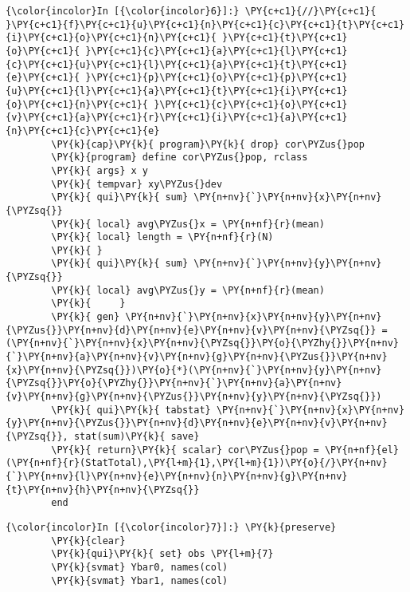 \documentclass[11pt,notitlepage]{article}\usepackage[]{graphicx}\usepackage[]{color}
\makeatletter
\newenvironment{kframe}{%
 \def\at@end@of@kframe{}%
 \ifinner\ifhmode%
  \def\at@end@of@kframe{\end{minipage}}%
  \begin{minipage}{\columnwidth}%
 \fi\fi%
 \def\FrameCommand##1{\hskip\@totalleftmargin \hskip-\fboxsep
 \colorbox{shadecolor}{##1}\hskip-\fboxsep
     \hskip-\linewidth \hskip-\@totalleftmargin \hskip\columnwidth}%
 \MakeFramed {\advance\hsize-\width
   \@totalleftmargin\z@ \linewidth\hsize
   \@setminipage}}%
 {\par\unskip\endMakeFramed%
 \at@end@of@kframe}
\newenvironment{knitrout}{}{} %
\makeatother
\begin{document}
\begin{enumerate}[a)]
\begin{knitrout}
\begin{kframe}
    \begin{Verbatim}[commandchars=\\\{\}]
{\color{incolor}In [{\color{incolor}6}]:} \PY{c+c1}{//}\PY{c+c1}{ }\PY{c+c1}{f}\PY{c+c1}{u}\PY{c+c1}{n}\PY{c+c1}{c}\PY{c+c1}{t}\PY{c+c1}{i}\PY{c+c1}{o}\PY{c+c1}{n}\PY{c+c1}{ }\PY{c+c1}{t}\PY{c+c1}{o}\PY{c+c1}{ }\PY{c+c1}{c}\PY{c+c1}{a}\PY{c+c1}{l}\PY{c+c1}{c}\PY{c+c1}{u}\PY{c+c1}{l}\PY{c+c1}{a}\PY{c+c1}{t}\PY{c+c1}{e}\PY{c+c1}{ }\PY{c+c1}{p}\PY{c+c1}{o}\PY{c+c1}{p}\PY{c+c1}{u}\PY{c+c1}{l}\PY{c+c1}{a}\PY{c+c1}{t}\PY{c+c1}{i}\PY{c+c1}{o}\PY{c+c1}{n}\PY{c+c1}{ }\PY{c+c1}{c}\PY{c+c1}{o}\PY{c+c1}{v}\PY{c+c1}{a}\PY{c+c1}{r}\PY{c+c1}{i}\PY{c+c1}{a}\PY{c+c1}{n}\PY{c+c1}{c}\PY{c+c1}{e}
        \PY{k}{cap}\PY{k}{ program}\PY{k}{ drop} cor\PYZus{}pop
        \PY{k}{program} define cor\PYZus{}pop, rclass
        \PY{k}{	args} x y	
        \PY{k}{	tempvar} xy\PYZus{}dev 
        \PY{k}{	qui}\PY{k}{ sum} \PY{n+nv}{`}\PY{n+nv}{x}\PY{n+nv}{\PYZsq{}}
        \PY{k}{	local} avg\PYZus{}x = \PY{n+nf}{r}(mean)
        \PY{k}{	local} length = \PY{n+nf}{r}(N)	
        \PY{k}{	}
        \PY{k}{	qui}\PY{k}{ sum} \PY{n+nv}{`}\PY{n+nv}{y}\PY{n+nv}{\PYZsq{}}
        \PY{k}{	local} avg\PYZus{}y = \PY{n+nf}{r}(mean)
        \PY{k}{		}
        \PY{k}{	gen} \PY{n+nv}{`}\PY{n+nv}{x}\PY{n+nv}{y}\PY{n+nv}{\PYZus{}}\PY{n+nv}{d}\PY{n+nv}{e}\PY{n+nv}{v}\PY{n+nv}{\PYZsq{}} = (\PY{n+nv}{`}\PY{n+nv}{x}\PY{n+nv}{\PYZsq{}}\PY{o}{\PYZhy{}}\PY{n+nv}{`}\PY{n+nv}{a}\PY{n+nv}{v}\PY{n+nv}{g}\PY{n+nv}{\PYZus{}}\PY{n+nv}{x}\PY{n+nv}{\PYZsq{}})\PY{o}{*}(\PY{n+nv}{`}\PY{n+nv}{y}\PY{n+nv}{\PYZsq{}}\PY{o}{\PYZhy{}}\PY{n+nv}{`}\PY{n+nv}{a}\PY{n+nv}{v}\PY{n+nv}{g}\PY{n+nv}{\PYZus{}}\PY{n+nv}{y}\PY{n+nv}{\PYZsq{}})
        \PY{k}{	qui}\PY{k}{ tabstat} \PY{n+nv}{`}\PY{n+nv}{x}\PY{n+nv}{y}\PY{n+nv}{\PYZus{}}\PY{n+nv}{d}\PY{n+nv}{e}\PY{n+nv}{v}\PY{n+nv}{\PYZsq{}}, stat(sum)\PY{k}{ save}
        \PY{k}{	return}\PY{k}{ scalar} cor\PYZus{}pop = \PY{n+nf}{el}(\PY{n+nf}{r}(StatTotal),\PY{l+m}{1},\PY{l+m}{1})\PY{o}{/}\PY{n+nv}{`}\PY{n+nv}{l}\PY{n+nv}{e}\PY{n+nv}{n}\PY{n+nv}{g}\PY{n+nv}{t}\PY{n+nv}{h}\PY{n+nv}{\PYZsq{}}
        end
\end{Verbatim}

    \begin{Verbatim}[commandchars=\\\{\}]
{\color{incolor}In [{\color{incolor}7}]:} \PY{k}{preserve} 
        \PY{k}{clear}
        \PY{k}{qui}\PY{k}{ set} obs \PY{l+m}{7}
        \PY{k}{svmat} Ybar0, names(col)
        \PY{k}{svmat} Ybar1, names(col)
\end{Verbatim}


\end{kframe}
\end{knitrout}
\end{enumerate}
\end{document}
